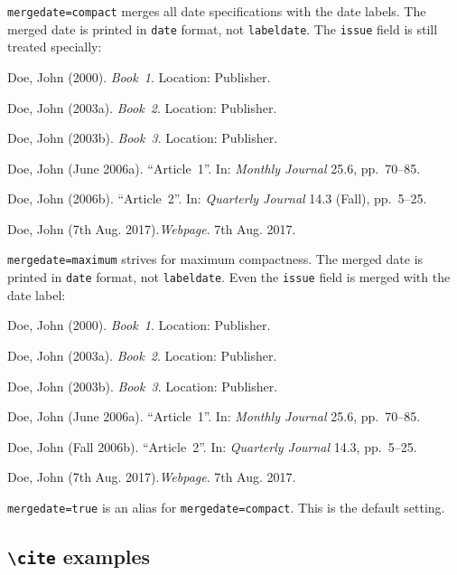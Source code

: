 \documentclass[a4paper]{article}
\newcommand{\cmd}[1]{\texttt{\textbackslash #1}}
\newenvironment{bibsample}
  {\trivlist\samepage
   \setlength{\itemsep}{0pt}}
  {\endtrivlist}
\begin{document}
\texttt{mergedate=compact} merges all date specifications with the
date labels. The merged date is printed in \texttt{date} format,
not \texttt{labeldate}. The \texttt{issue} field is still treated specially:

\begin{bibsample}
\item Doe, John (2000). \emph{Book~1}. Location: Publisher.
\item Doe, John (2003a). \emph{Book~2}. Location: Publisher.
\item Doe, John (2003b). \emph{Book~3}. Location: Publisher.
\item Doe, John (June 2006a). \enquote{Article~1}. In: \emph{Monthly Journal} 25.6, pp.~70--85.
\item Doe, John (2006b). \enquote{Article~2}. In: \emph{Quarterly Journal} 14.3
(Fall), pp.~5--25.
\item Doe, John (7th Aug. 2017).\emph{Webpage}. 7th Aug. 2017.
\end{bibsample}

\texttt{mergedate=maximum} strives for maximum compactness.
The merged date is printed in \texttt{date} format, not
\texttt{labeldate}.
Even the \texttt{issue} field is merged with the date label:

\begin{bibsample}
\item Doe, John (2000). \emph{Book~1}. Location: Publisher.
\item Doe, John (2003a). \emph{Book~2}. Location: Publisher.
\item Doe, John (2003b). \emph{Book~3}. Location: Publisher.
\item Doe, John (June 2006a). \enquote{Article~1}. In: \emph{Monthly Journal} 25.6, pp.~70--85.
\item Doe, John (Fall 2006b). \enquote{Article~2}. In: \emph{Quarterly Journal} 14.3, pp.~5--25.
\item Doe, John (7th Aug. 2017).\emph{Webpage}. 7th Aug. 2017.
\end{bibsample}

\texttt{mergedate=true} is an alias for \texttt{mergedate=compact}.
This is the default setting.

\subsection*{\cmd{cite} examples}

\cite{companion}

\cite[59]{companion}
\end{document}
